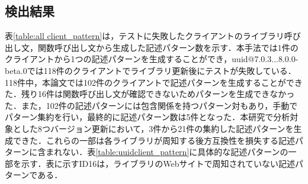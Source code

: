 \documentclass[T,J]{fose} %
\begin{document}
\subsection{検出結果}
表\ref{table:all client_pattern}は，テストに失敗したクライアントのライブラリ呼び出し文，関数呼び出し文から生成した記述パターン数を示す．本手法では1件のクライアントから1つの記述パターンを生成することができ，uuid@7.0.3...8.0.0-beta.0では118件のクライアントでライブラリ更新後にテストが失敗している．118件中，本論文では102件のクライアントで記述パターンを生成することができた．残り16件は関数呼び出し文が確認できないためパターンを生成できなかった．また，102件の記述パターンには包含関係を持つパターン対もあり，手動でパターン集約を行い，最終的に記述パターン数は5件となった．本研究で分析対象とした8つバージョン更新において，3件から21件の集約した記述パターンを生成できた．これらの一部は各ライブラリが周知する後方互換性を損失する記述パターンに含まれない．表\ref{table:uuidclient_pattern}に具体的な記述パターンの一部を示す．表に示すID16は，ライブラリのWebサイトで周知されていない記述パターンである．
\end{document}
